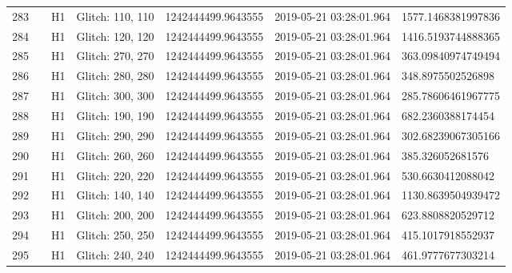 \begin{longtable}{lllllll}
283  &                                                    &       H1 &  Glitch: 110, 110 &  1242444499.9643555 &  2019-05-21 03:28:01.964 &  1577.1468381997836 \\
284  &                                                    &       H1 &  Glitch: 120, 120 &  1242444499.9643555 &  2019-05-21 03:28:01.964 &  1416.5193744888365 \\
285  &                                                    &       H1 &  Glitch: 270, 270 &  1242444499.9643555 &  2019-05-21 03:28:01.964 &  363.09840974749494 \\
286  &                                                    &       H1 &  Glitch: 280, 280 &  1242444499.9643555 &  2019-05-21 03:28:01.964 &   348.8975502526898 \\
287  &                                                    &       H1 &  Glitch: 300, 300 &  1242444499.9643555 &  2019-05-21 03:28:01.964 &  285.78606461967775 \\
288  &                                                    &       H1 &  Glitch: 190, 190 &  1242444499.9643555 &  2019-05-21 03:28:01.964 &   682.2360388174454 \\
289  &                                                    &       H1 &  Glitch: 290, 290 &  1242444499.9643555 &  2019-05-21 03:28:01.964 &  302.68239067305166 \\
290  &                                                    &       H1 &  Glitch: 260, 260 &  1242444499.9643555 &  2019-05-21 03:28:01.964 &    385.326052681576 \\
291  &                                                    &       H1 &  Glitch: 220, 220 &  1242444499.9643555 &  2019-05-21 03:28:01.964 &   530.6630412088042 \\
292  &                                                    &       H1 &  Glitch: 140, 140 &  1242444499.9643555 &  2019-05-21 03:28:01.964 &  1130.8639504939472 \\
293  &                                                    &       H1 &  Glitch: 200, 200 &  1242444499.9643555 &  2019-05-21 03:28:01.964 &   623.8808820529712 \\
294  &                                                    &       H1 &  Glitch: 250, 250 &  1242444499.9643555 &  2019-05-21 03:28:01.964 &   415.1017918552937 \\
295  &                                                    &       H1 &  Glitch: 240, 240 &  1242444499.9643555 &  2019-05-21 03:28:01.964 &   461.9777677303214 \\

\end{longtable}
